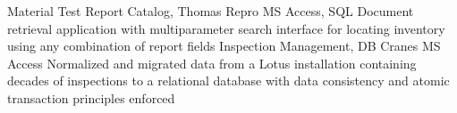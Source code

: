 %
%
%
%
%
\justifiedsubsection%
{Material Test Report Catalog, Thomas Repro}
{MS Access, SQL}
\workitemsOne%
{Document retrieval application with multiparameter search interface for locating inventory using any combination of report fields}
%
%
%
\justifiedsubsection%
{Inspection Management, DB Cranes}
{MS Access}
\workitemsOne%
{Normalized and migrated data from a Lotus installation containing decades of inspections to a relational database with data consistency and atomic transaction principles enforced}
%
%
%
%
%